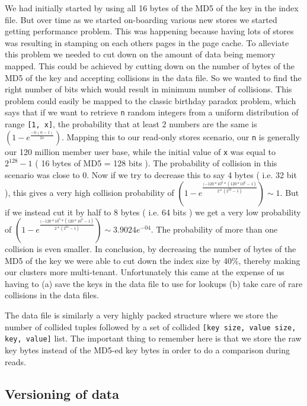 \documentclass[10pt,twocolumn,preprint,natbib,authoryear]{sigplanconf}
\begin{document}
We had initially started by using all 16 bytes of the MD5 of the key in the index file. But over time as we started on-boarding various new stores we started getting performance problem. This was happening because having lots of stores was resulting in stamping on each others pages in the page cache. To alleviate this problem we needed to cut down on the amount of data being memory mapped. This could be achieved by cutting down on the number of bytes of the MD5 of the key and accepting collisions in the data file. So we wanted to find the right number of bits which would result in minimum number of collisions. This problem could easily be mapped to the classic birthday paradox problem,  which says that if we want to retrieve \verb=n= random integers from a uniform distribution of range \verb=[1, x]=, the probability that at least 2 numbers are the same is  $(1 - e^{\frac{-n(n-1)}{2x}})$. Mapping this to our read-only stores scenario, our \verb=n= is generally our 120 million member user base, while the initial value of \verb=x= was equal to $2^{128} - 1$ ( 16 bytes of MD5 = 128 bits ). The probability of collision in this scenario was close to 0. Now if we try to decrease this to say 4 bytes ( i.e. 32 bit ), this gives a very high collision probability of $(1 - e^{\frac{(-120*10^{6} * ( 120*10^{6} - 1)}{2 * (2^{32} - 1)}}) \sim 1$. But if we instead cut it by half to 8 bytes ( i.e. 64 bits ) we get a very low probability of $(1 - e^{\frac{(-120*10^{6} * (120*10^{6} - 1)} { 2 * (2^{64} - 1 )}}) \sim 3.9024e^{-04}$. The probability of more than one collision is even smaller. In conclusion, by decreasing the number of bytes of the MD5 of the key we were able to cut down the index size by 40\%, thereby making our clusters more multi-tenant. Unfortunately this came at the expense of us having to (a) save the keys in the data file to use for lookups (b) take care of rare collisions in the data files.

The data file is similarly a very highly packed structure where we store the number of collided tuples followed by a set of collided \verb=[key size, value size, key, value]= list. The important thing to remember here is that we store the raw key bytes instead of the MD5-ed key bytes in order to do a comparison during reads. 



\subsection{Versioning of data}
\label{sec:read_only:versioning}
\end{document}
